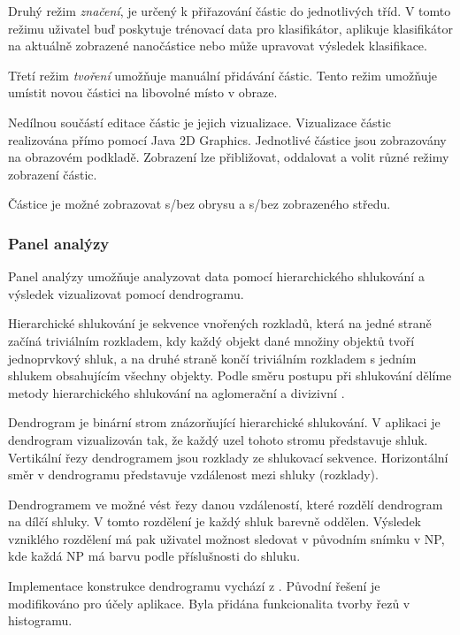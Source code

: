 \documentclass[11pt,twoside,a4paper,table]{book}
\begin{document}
Druhý režim \textit{značení}, je určený k přiřazování částic do jednotlivých tříd. V tomto režimu uživatel buď poskytuje trénovací data pro klasifikátor, aplikuje klasifikátor na aktuálně zobrazené nanočástice nebo může upravovat výsledek klasifikace.

Třetí režim \textit{tvoření} umožňuje manuální přidávání částic. Tento režim umožňuje umístit novou částici na libovolné místo v obraze.

Nedílnou součástí editace částic je jejich vizualizace. Vizualizace částic realizována přímo pomocí Java 2D Graphics. Jednotlivé částice jsou zobrazovány na obrazovém podkladě. Zobrazení lze přibližovat, oddalovat a volit různé režimy zobrazení částic.

Částice je možné zobrazovat s/bez obrysu a s/bez zobrazeného středu.

\subsubsection{Panel analýzy}
Panel analýzy umožňuje analyzovat data pomocí hierarchického shlukování a výsledek vizualizovat pomocí dendrogramu.

Hierarchické shlukování je sekvence vnořených rozkladů, která na jedné straně začíná triviálním rozkladem, kdy každý objekt dané množiny objektů tvoří jednoprvkový shluk, a na
druhé straně končí triviálním rozkladem s jedním shlukem obsahujícím všechny objekty.
Podle směru postupu při shlukování dělíme metody hierarchického shlukování na aglomerační
a divizivní \cite{on:shlukovani}.

Dendrogram je binární strom znázorňující hierarchické shlukování. V aplikaci je dendrogram vizualizován tak, že každý uzel tohoto stromu představuje shluk. Vertikální řezy dendrogramem jsou rozklady ze shlukovací sekvence. Horizontální směr v dendrogramu představuje vzdálenost mezi shluky (rozklady).

Dendrogramem ve možné vést řezy danou vzdáleností, které rozdělí dendrogram na dílčí shluky. V tomto rozdělení je každý shluk barevně oddělen. Výsledek vzniklého rozdělení má pak uživatel možnost sledovat v původním snímku v NP, kde každá NP má barvu podle příslušnosti do shluku.  

Implementace konstrukce dendrogramu vychází z \cite{on:shlukovani_java}. Původní řešení je modifikováno pro účely aplikace. Byla přidána funkcionalita tvorby řezů v histogramu.
\end{document}
